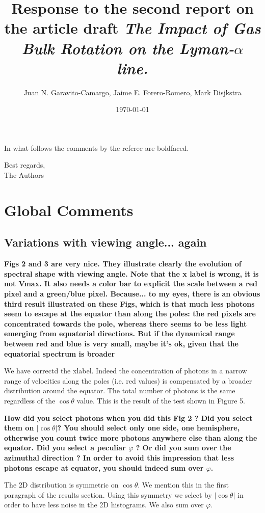 \documentclass[12pt]{article}
\title{Response to the second report on the article draft \emph{The
    Impact of Gas Bulk Rotation on the Lyman-$\alpha$ line.}}
\author{Juan N. Garavito-Camargo, Jaime E. Forero-Romero, Mark Disjkstra}
\date{\today}
\begin{document}
\maketitle

In what follows the comments by the referee are boldfaced.

Best regards, \\

The Authors\\


\section*{Global Comments}

\subsection*{Variations with viewing angle... again}

{\bf Figs 2 and 3 are very nice. They illustrate clearly the evolution
  of spectral shape with viewing angle. Note that the x label is
  wrong, it is not Vmax. It also needs a color bar to explicit the
  scale between a red pixel and a green/blue pixel. Because... to my
  eyes, there is an obvious third result illustrated on these Figs,
  which is that much less photons seem to escape at the equator than
  along the poles: the red pixels are concentrated towards the pole,
  whereas there seems to be less light emerging from equatorial
  directions. But if the dynamical range between red and blue is very
  small, maybe it’s ok, given that the equatorial spectrum is
  broader}

We have correctd the xlabel. Indeed the
concentration of photons in a narrow range of velocities along the
poles (i.e. red values) is compensated by a broader distribution
around the equator. The total number of photons is the same regardless
of the $\cos\theta$ value. This is the result of the test shown in
Figure 5. 




{\bf How did you select photons when you did this Fig 2 ? Did you
  select them on $|\cos\theta|$? You should select only one side, one
  hemisphere, otherwise you count twice more photons anywhere else
  than along the equator. Did you select a peculiar $\varphi$ ? Or did
  you sum over the azimuthal direction ? In order to avoid this
  impression that less photons escape at equator, you should indeed
  sum over $\varphi$. }

The 2D distribution is symmetric on $\cos\theta$. We mention this in
the first paragraph of the results section. Using this symmetry we select
by $|\cos\theta|$ in order to have less noise in the 2D histograms. We
also sum over $\varphi$.
\end{document}
